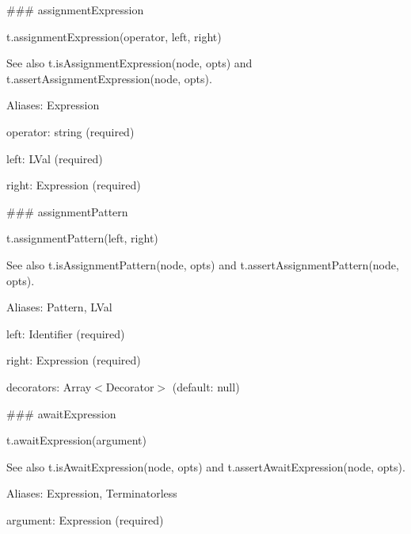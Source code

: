 \#\#\# assignment\+Expression 
\begin{DoxyCode}
t.assignmentExpression(operator, left, right)
\end{DoxyCode}


See also {\ttfamily t.\+is\+Assignment\+Expression(node, opts)} and {\ttfamily t.\+assert\+Assignment\+Expression(node, opts)}.

Aliases\+: {\ttfamily Expression}


\begin{DoxyItemize}
\item {\ttfamily operator}\+: {\ttfamily string} (required)
\item {\ttfamily left}\+: {\ttfamily L\+Val} (required)
\item {\ttfamily right}\+: {\ttfamily Expression} (required) 


\end{DoxyItemize}

\#\#\# assignment\+Pattern 
\begin{DoxyCode}
t.assignmentPattern(left, right)
\end{DoxyCode}


See also {\ttfamily t.\+is\+Assignment\+Pattern(node, opts)} and {\ttfamily t.\+assert\+Assignment\+Pattern(node, opts)}.

Aliases\+: {\ttfamily Pattern}, {\ttfamily L\+Val}


\begin{DoxyItemize}
\item {\ttfamily left}\+: {\ttfamily Identifier} (required)
\item {\ttfamily right}\+: {\ttfamily Expression} (required)
\item {\ttfamily decorators}\+: {\ttfamily Array$<$Decorator$>$} (default\+: {\ttfamily null}) 


\end{DoxyItemize}

\#\#\# await\+Expression 
\begin{DoxyCode}
t.awaitExpression(argument)
\end{DoxyCode}


See also {\ttfamily t.\+is\+Await\+Expression(node, opts)} and {\ttfamily t.\+assert\+Await\+Expression(node, opts)}.

Aliases\+: {\ttfamily Expression}, {\ttfamily Terminatorless}


\begin{DoxyItemize}
\item {\ttfamily argument}\+: {\ttfamily Expression} (required) 


\end{DoxyItemize}


